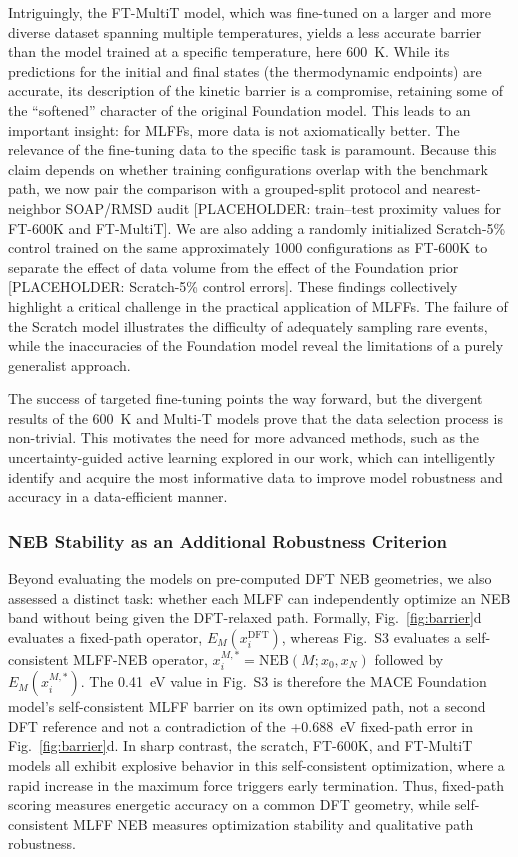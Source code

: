 \documentclass[pdflatex,sn-mathphys-num]{sn-jnl}%
\providecommand{\reviewermap}[3]{}
\theoremstyle{thmstyleone}%
\theoremstyle{thmstyletwo}%
\theoremstyle{thmstylethree}%
\begin{document}
Intriguingly, the FT-MultiT model, which was fine-tuned on a larger and more diverse dataset spanning multiple temperatures, yields a less accurate barrier than the model trained at a specific temperature, here 600~K. While its predictions for the initial and final states (the thermodynamic endpoints) are accurate, its description of the kinetic barrier is a compromise, retaining some of the ``softened'' character of the original Foundation model. This leads to an important insight: for MLFFs, more data is not axiomatically better. The relevance of the fine-tuning data to the specific task is paramount. Because this claim depends on whether training configurations overlap with the benchmark path, we now pair the comparison with a grouped-split protocol and nearest-neighbor SOAP/RMSD audit [PLACEHOLDER: train--test proximity values for FT-600K and FT-MultiT]. We are also adding a randomly initialized Scratch-5\% control trained on the same approximately 1000 configurations as FT-600K to separate the effect of data volume from the effect of the Foundation prior [PLACEHOLDER: Scratch-5\% control errors]. These findings collectively highlight a critical challenge in the practical application of MLFFs. The failure of the Scratch model illustrates the difficulty of adequately sampling rare events, while the inaccuracies of the Foundation model reveal the limitations of a purely generalist approach.

The success of targeted fine-tuning points the way forward, but the divergent results of the 600~K and Multi-T models prove that the data selection process is non-trivial. This motivates the need for more advanced methods, such as the uncertainty-guided active learning explored in our work, which can intelligently identify and acquire the most informative data to improve model robustness and accuracy in a data-efficient manner.


\subsubsection{NEB Stability as an Additional Robustness Criterion}
\reviewermap{REV-A1}{partial}{Define Fig. 3d and SI Fig. S3 as different NEB operators and report them side-by-side.}
Beyond evaluating the models on pre-computed DFT NEB geometries, we also assessed a distinct task: whether each MLFF can independently optimize an NEB band without being given the DFT-relaxed path. Formally, Fig.~\ref{fig:barrier}d evaluates a fixed-path operator, $E_M(x_i^{\mathrm{DFT}})$, whereas Fig.~S3 evaluates a self-consistent MLFF-NEB operator, $x_i^{M,*}=\mathrm{NEB}(M;x_0,x_N)$ followed by $E_M(x_i^{M,*})$. The 0.41~eV value in Fig.~S3 is therefore the MACE Foundation model's self-consistent MLFF barrier on its own optimized path, not a second DFT reference and not a contradiction of the +0.688~eV fixed-path error in Fig.~\ref{fig:barrier}d. In sharp contrast, the scratch, FT-600K, and FT-MultiT models all exhibit explosive behavior in this self-consistent optimization, where a rapid increase in the maximum force triggers early termination. Thus, fixed-path scoring measures energetic accuracy on a common DFT geometry, while self-consistent MLFF NEB measures optimization stability and qualitative path robustness.
\end{document}
